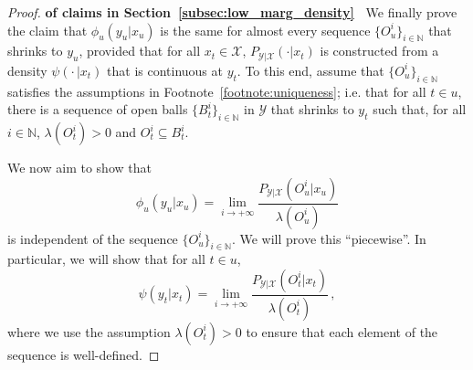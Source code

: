 \documentclass[3p]{elsarticle}
\newcommand{\nats}{\mathbb{N}}
\newcommand{\states}{\mathcal{X}}
\newcommand{\observs}{\mathcal{Y}}
\begin{document}
\begin{proof}{\bf of claims in Section~\ref{subsec:low_marg_density}~}
We finally prove the claim that $\phi_u(y_u\vert x_u)$ is the same for almost every sequence $\{O_u^i\}_{i\in\nats}$ that shrinks to $y_u$, provided that for all $x_t\in\states$, $P_{\observs\vert\states}(\cdot\vert x_t)$ is constructed from a density $\psi(\cdot\,\vert x_t)$ that is continuous at $y_t$. To this end, assume that $\{O_u^i\}_{i\in\nats}$ satisfies the assumptions in Footnote~\ref{footnote:uniqueness}; i.e. that for all $t\in u$, there is a sequence of open balls $\{B_t^i\}_{i\in\nats}$ in $\observs$ that shrinks to $y_t$ such that, for all $i\in\nats$, $\lambda(O_t^i)>0$ and $O_t^i\subseteq B_t^i$.


We now aim to show that
\begin{equation*}
\phi_u(y_u\vert x_u) = \lim_{i\to+\infty} \frac{P_{\observs\vert\states}(O_u^i\vert x_u)}{\lambda(O_u^i)}
\end{equation*}
is independent of the sequence $\{O_u^i\}_{i\in\nats}$. We will prove this ``piecewise''. In particular, we will show that for all $t\in u$,
\begin{equation*}
\psi(y_t\vert x_t) = \lim_{i\to+\infty} \frac{P_{\observs\vert\states}(O_t^i\vert x_t)}{\lambda(O_t^i)}\,,
\end{equation*}
where we use the assumption $\lambda(O_t^i)>0$ to ensure that each element of the sequence is well-defined.


\end{proof}
\end{document}
